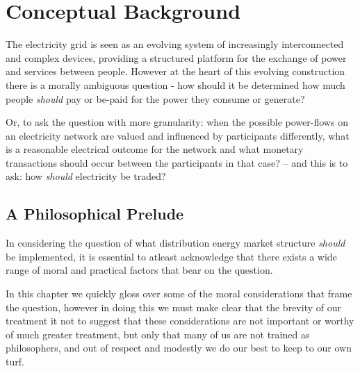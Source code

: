 \section{Conceptual Background}
\label{cha:background}

The electricity grid is seen as an evolving system of increasingly interconnected and complex devices, providing a structured platform for the exchange of power and services between people.
However at the heart of this evolving construction there is a morally ambiguous question - how should it be determined how much people \textit{should} pay or be-paid for the power they consume or generate?

Or, to ask the question with more granularity: when the possible power-flows on an electricity network are valued and influenced by participants differently, 
what is a reasonable electrical outcome for the network and what monetary transactions should occur between the participants in that case? -- and this is to ask: how \textit{should} electricity be traded?\\


\subsection{A Philosophical Prelude}


In considering the question of what distribution energy market structure \textit{should} be implemented, it is essential to atleast acknowledge that there exists a wide range of moral and practical factors that bear on the question.

In this chapter we quickly gloss over some of the moral considerations that frame the question, however in doing this we must make clear that the brevity of our treatment it not to suggest that these considerations are not important or worthy of much greater treatment, but only that many of us are not trained as philosophers, and out of respect and modestly we do our best to keep to our own turf.

